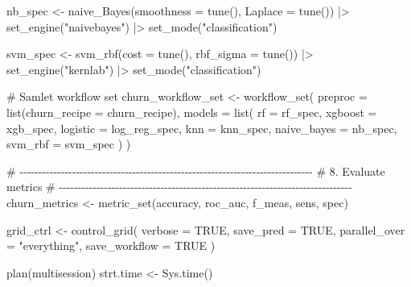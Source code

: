 \documentclass[
  11pt,
  letterpaper,
  DIV=11,
  numbers=noendperiod]{scrartcl}
\newenvironment{Shaded}{\begin{snugshade}}{\end{snugshade}}
\newcommand{\AttributeTok}[1]{\textcolor[rgb]{0.40,0.45,0.13}{#1}}
\newcommand{\CommentTok}[1]{\textcolor[rgb]{0.37,0.37,0.37}{#1}}
\newcommand{\ConstantTok}[1]{\textcolor[rgb]{0.56,0.35,0.01}{#1}}
\newcommand{\FunctionTok}[1]{\textcolor[rgb]{0.28,0.35,0.67}{#1}}
\newcommand{\NormalTok}[1]{\textcolor[rgb]{0.00,0.23,0.31}{#1}}
\newcommand{\OtherTok}[1]{\textcolor[rgb]{0.00,0.23,0.31}{#1}}
\newcommand{\SpecialCharTok}[1]{\textcolor[rgb]{0.37,0.37,0.37}{#1}}
\newcommand{\StringTok}[1]{\textcolor[rgb]{0.13,0.47,0.30}{#1}}
\begin{document}
\begin{Shaded}
\begin{Highlighting}[]
\NormalTok{nb\_spec }\OtherTok{\textless{}{-}} \FunctionTok{naive\_Bayes}\NormalTok{(}\AttributeTok{smoothness =} \FunctionTok{tune}\NormalTok{(), }\AttributeTok{Laplace =} \FunctionTok{tune}\NormalTok{()) }\SpecialCharTok{|\textgreater{}}
  \FunctionTok{set\_engine}\NormalTok{(}\StringTok{"naivebayes"}\NormalTok{) }\SpecialCharTok{|\textgreater{}}
  \FunctionTok{set\_mode}\NormalTok{(}\StringTok{"classification"}\NormalTok{)}

\NormalTok{svm\_spec }\OtherTok{\textless{}{-}} \FunctionTok{svm\_rbf}\NormalTok{(}\AttributeTok{cost =} \FunctionTok{tune}\NormalTok{(), }\AttributeTok{rbf\_sigma =} \FunctionTok{tune}\NormalTok{()) }\SpecialCharTok{|\textgreater{}}
  \FunctionTok{set\_engine}\NormalTok{(}\StringTok{"kernlab"}\NormalTok{) }\SpecialCharTok{|\textgreater{}}
  \FunctionTok{set\_mode}\NormalTok{(}\StringTok{"classification"}\NormalTok{)}

\CommentTok{\# Samlet workflow set}
\NormalTok{churn\_workflow\_set }\OtherTok{\textless{}{-}} \FunctionTok{workflow\_set}\NormalTok{(}
  \AttributeTok{preproc =} \FunctionTok{list}\NormalTok{(}\AttributeTok{churn\_recipe =}\NormalTok{ churn\_recipe),}
  \AttributeTok{models =} \FunctionTok{list}\NormalTok{(}
    \AttributeTok{rf =}\NormalTok{ rf\_spec,}
    \AttributeTok{xgboost =}\NormalTok{ xgb\_spec,}
    \AttributeTok{logistic =}\NormalTok{ log\_reg\_spec,}
    \AttributeTok{knn =}\NormalTok{ knn\_spec,}
    \AttributeTok{naive\_bayes =}\NormalTok{ nb\_spec,}
    \AttributeTok{svm\_rbf =}\NormalTok{ svm\_spec}
\NormalTok{  )}
\NormalTok{)}
\end{Highlighting}
\end{Shaded}

\begin{Shaded}
\begin{Highlighting}[]
\CommentTok{\# {-}{-}{-}{-}{-}{-}{-}{-}{-}{-}{-}{-}{-}{-}{-}{-}{-}{-}{-}{-}{-}{-}{-}{-}{-}{-}{-}{-}{-}{-}{-}{-}{-}{-}{-}{-}{-}{-}{-}{-}{-}{-}{-}{-}{-}{-}{-}{-}{-}{-}{-}{-}{-}{-}{-}{-}{-}{-}{-}{-}{-}{-}{-}{-}{-}{-}{-}{-}{-}{-}{-}{-}{-}{-}{-}{-}{-}{-}}
\CommentTok{\# 8. Evaluate metrics}
\CommentTok{\# {-}{-}{-}{-}{-}{-}{-}{-}{-}{-}{-}{-}{-}{-}{-}{-}{-}{-}{-}{-}{-}{-}{-}{-}{-}{-}{-}{-}{-}{-}{-}{-}{-}{-}{-}{-}{-}{-}{-}{-}{-}{-}{-}{-}{-}{-}{-}{-}{-}{-}{-}{-}{-}{-}{-}{-}{-}{-}{-}{-}{-}{-}{-}{-}{-}{-}{-}{-}{-}{-}{-}{-}{-}{-}{-}{-}{-}{-}}
\NormalTok{churn\_metrics }\OtherTok{\textless{}{-}} \FunctionTok{metric\_set}\NormalTok{(accuracy, roc\_auc, f\_meas, sens, spec)}

\NormalTok{grid\_ctrl }\OtherTok{\textless{}{-}} \FunctionTok{control\_grid}\NormalTok{(}
  \AttributeTok{verbose =} \ConstantTok{TRUE}\NormalTok{,}
  \AttributeTok{save\_pred =} \ConstantTok{TRUE}\NormalTok{,}
  \AttributeTok{parallel\_over =} \StringTok{"everything"}\NormalTok{,}
  \AttributeTok{save\_workflow =} \ConstantTok{TRUE}
\NormalTok{)}

\FunctionTok{plan}\NormalTok{(multisession)}
\NormalTok{strt.time }\OtherTok{\textless{}{-}} \FunctionTok{Sys.time}\NormalTok{()}
\end{Highlighting}
\end{Shaded}
\end{document}
